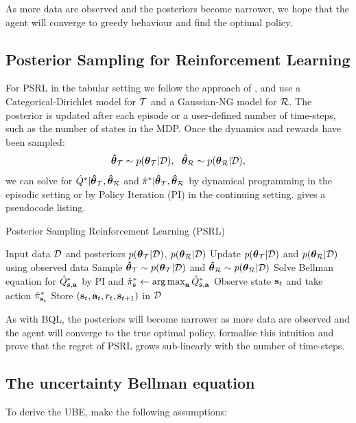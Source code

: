 \documentclass{article}
\begin{document}
\begin{appendices}
As more data are observed and the posteriors become narrower, we hope that the agent will converge to greedy behaviour and find the optimal policy.

\subsection{Posterior Sampling for Reinforcement Learning} \label{app:psrl}

For PSRL in the tabular setting we follow the approach of \cite{psrl}, and use a Categorical-Dirichlet model for $\mathcal{T}$ and a Gaussian-NG model for $\mathcal{R}$. The posterior is updated after each episode or a user-defined number of time-steps, such as the number of states in the MDP. Once the dynamics and rewards have been sampled:
$$\boldsymbol{\hat{\theta}}_{\mathcal{T}} \sim p(\boldsymbol{\theta}_{\mathcal{T}} | \mathcal{D}),~~ \boldsymbol{\hat{\theta}}_{\mathcal{R}} \sim p(\boldsymbol{\theta}_{\mathcal{R}} | \mathcal{D}),$$
we can solve for $\hat{Q}^* | \boldsymbol{\hat{\theta}}_{\mathcal{T}}, \boldsymbol{\hat{\theta}}_{\mathcal{R}} $ and $\hat{\pi}^* | \boldsymbol{\hat{\theta}}_{\mathcal{T}}, \boldsymbol{\hat{\theta}}_{\mathcal{R}}$ by dynamical programming in the episodic setting or by Policy Iteration (PI) in the continuing setting.  gives a pseudocode listing.

\begin{algorithm}
  \caption{Posterior Sampling Reinforcement Learning (PSRL)}\label{alg:psrl}
  \begin{algorithmic}[1]
\State Input data $\mathcal{D}$ and posteriors $p(\boldsymbol{\theta}_{\mathcal{T}} | \mathcal{D})$, $p(\boldsymbol{\theta}_{\mathcal{R}} | \mathcal{D})$
	\State Update $p(\boldsymbol{\theta}_{\mathcal{T}} | \mathcal{D})$ and $p(\boldsymbol{\theta}_{\mathcal{R}} | \mathcal{D})$ using observed data
	\State Sample $\boldsymbol{\hat{\theta}}_{\mathcal{T}} \sim p(\boldsymbol{\theta}_{\mathcal{T}} | \mathcal{D})$ and $\boldsymbol{\hat{\theta}}_{\mathcal{R}} \sim p(\boldsymbol{\theta}_{\mathcal{R}} | \mathcal{D})$
	\State Solve Bellman equation for $\hat{Q}^*_{\mathbf{s}, \mathbf{a}}$ by PI and $\hat{\pi}^*_{\mathbf{s}} \leftarrow \operatorname*{arg\,max}_{\mathbf{a}} \hat{Q}^*_{\mathbf{s}, \mathbf{a}}$
	\EndIf
	\State Observe state $\mathbf{s}_t$ and take action $\hat{\pi}^*_{\mathbf{s}_t}$
	\State Store $(\mathbf{s}_t, \mathbf{a}_t, r_t, \mathbf{s}_{t+1})$ in $\mathcal{D}$
 \EndFor
\end{algorithmic}
\end{algorithm}

As with BQL, the posteriors will become narrower as more data are observed and the agent will converge to the true optimal policy. \cite{psrl} formalise this intuition and prove that the regret of PSRL grows sub-linearly with the number of time-steps.

\subsection{The uncertainty Bellman equation}\label{app:ube}
To derive the UBE, \cite{ube} make the following assumptions:


\end{appendices}
\end{document}
